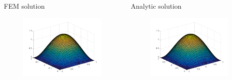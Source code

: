 \documentclass[screen]{beamer}
\begin{document}
\begin{frame}


\begin{columns}   
    \begin{column}{.5\linewidth}
    \centering
    FEM solution
        \begin{figure}
  		\includegraphics[scale=0.4]{figures/convergence2dFEM}
  		\end{figure}
    \end{column}   
    \begin{column}{.5\linewidth}
    \centering
	Analytic solution
        \begin{figure}
  		\includegraphics[scale=0.4]{figures/convergence2dreal}
  		\end{figure}
    \end{column}
  \end{columns}

\end{frame}
\end{document}
